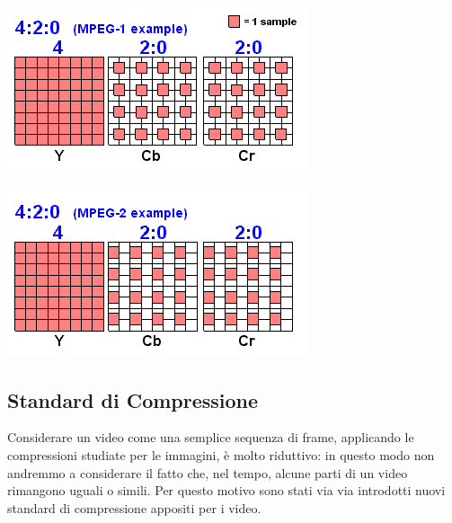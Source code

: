 \documentclass[a4paper,11pt]{article} %
\begin{document}
\hspace{0.15\textwidth}%
\begin{minipage}{0.3\textwidth}
\centering
    \includegraphics[width=\linewidth]{Sampling 420 1.png}
\end{minipage}%
\hspace{0.05\textwidth}%
\begin{minipage}{0.3\textwidth}
\centering
    \includegraphics[width=\linewidth]{Sampling 420 2.png}
\end{minipage}%
\hspace{0.15\textwidth}%

\subsection{Standard di Compressione}
Considerare un video come una semplice sequenza di frame, applicando le compressioni studiate per le immagini, è molto riduttivo: in questo modo non andremmo a considerare il fatto che, nel tempo, alcune parti di un video rimangono uguali o simili. Per questo motivo sono stati via via introdotti nuovi standard di compressione appositi per i video.
\end{document}
